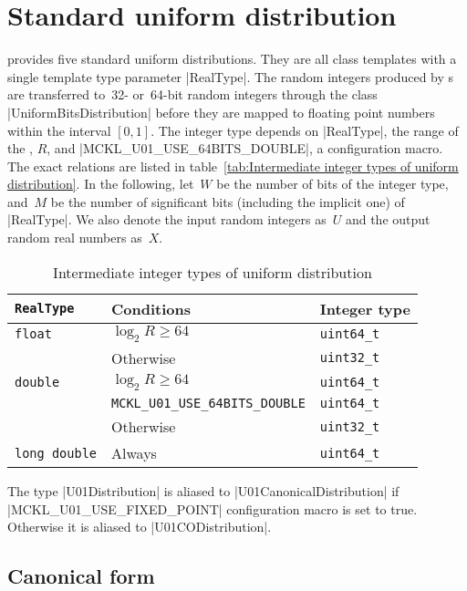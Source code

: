 \section{Standard uniform distribution}
\label{sec:Standard uniform distribution}

\mckl provides five standard uniform distributions. They are all class
templates with a single template type parameter |RealType|. The random integers
produced by \rng{}s are transferred to~32- or~64-bit random integers through
the class |UniformBitsDistribution| before they are mapped to floating point
numbers within the interval $[0, 1]$. The integer type depends on |RealType|,
the range of the \rng{}, $R$, and |MCKL_U01_USE_64BITS_DOUBLE|, a configuration
macro. The exact relations are listed in table~\ref{tab:Intermediate integer
types of uniform distribution}. In the following, let~$W$ be the number of bits
of the integer type, and~$M$ be the number of significant bits (including the
implicit one) of |RealType|. We also denote the input random integers as~$U$
and the output random real numbers as~$X$.

\begin{table}
  \begin{tabularx}{\textwidth}{LlL}
    \toprule
    \texttt{RealType} & Conditions & Integer type \\
    \midrule
    \texttt{float}  & $\log_2 R \ge 64$ & \texttt{uint64\_t} \\
                    & Otherwise         & \texttt{uint32\_t} \\
    \texttt{double} & $\log_2 R \ge 64$ & \texttt{uint64\_t} \\
    & \texttt{MCKL\_U01\_USE\_64BITS\_DOUBLE} & \texttt{uint64\_t} \\
    & Otherwise & \texttt{uint32\_t} \\
    \texttt{long double} & Always & \texttt{uint64\_t} \\
    \bottomrule
  \end{tabularx}
  \caption{Intermediate integer types of uniform distribution}
  \label{tab:Intermediate integer types of uniform distribution}
\end{table}

The type |U01Distribution| is aliased to |U01CanonicalDistribution| if
|MCKL_U01_USE_FIXED_POINT| configuration macro is set to true. Otherwise it is
aliased to |U01CODistribution|.

\subsection{Canonical form}
\label{sub:Canonical form}

